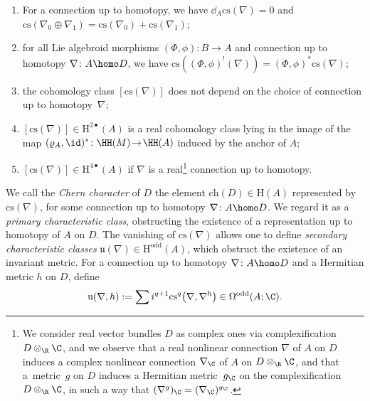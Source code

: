 \begin{proposition}\label{pro : primary}\quad
 \begin{enumerate}\itemsep=0pt
 \item[$a)$] For a connection up to homotopy, we have $\dd_A\mathrm{cs}(\nabla) = 0$ and $\mathrm{cs}(\nabla_0 \oplus \nabla_1)=\mathrm{cs}(\nabla_0)+\mathrm{cs}(\nabla_1)$;
 \item[$b)$] for all Lie algebroid morphisms $(\Phi,\phi)\colon B \to A$ and connection up to homotopy $\nabla\colon A \homo D$, we have $\mathrm{cs}((\Phi,\phi)^!(\nabla)) = (\Phi,\phi)^*\mathrm{cs}(\nabla)$;
 \item[$c)$] the cohomology class $[\mathrm{cs}(\nabla)]$ does not depend on the choice of connection up to homotopy~$\nabla$;
 \item[$d)$] $[\mathrm{cs}(\nabla)] \!\in\! \mathrm{H}^{2\bullet}(A)$ is a real cohomology class lying in the image of the map $(\varrho_A,\id)^*\colon \HH(M) \!\to\! \HH(A)$ induced by the anchor of $A$;
 \item[$e)$] $[\mathrm{cs}(\nabla)] \in \mathrm{H}^{4\bullet}(A)$ if $\nabla$ is a real\footnote{We consider real vector bundles $D$ as complex ones via complexification $D \otimes_{\R}\C$, and we observe that a real nonlinear connection $\nabla$ of $A$ on $D$ induces a complex nonlinear connection $\nabla_{\C}$ of $A$ on $D \otimes_{\R}\C$, and that a~metric~$g$ on $D$ induces a Hermitian metric~$g_{\C}$ on the complexification $D \otimes_{\R}\C$, in such a way that $(\nabla^g)_{\C} = (\nabla_{\C})^{g_{\C}}$.} connection up to homotopy.
 \end{enumerate}
\end{proposition}

We call the {\it Chern character} of $D$ the element $\mathrm{ch}(D) \in \mathrm{H}(A)$ represented by $\mathrm{cs}(\nabla)$, for some connection up to homotopy $\nabla\colon A \homo D$. We regard it as a {\it primary characteristic class}, obstructing the existence of a representation up to homotopy of $A$ on $D$. The vanishing of $\mathrm{cs}(\nabla)$ allows one to define {\it secondary characteristic classes} $\mathfrak{u}(\nabla) \in \mathrm{H}^{\mathrm{odd}}(A)$, which obstruct the existence of an invariant metric. For a connection up to homotopy $\nabla\colon A \homo D$ and a Hermitian metric $h$ on $D$, define
\begin{gather*}
 \mathrm{u}(\nabla,h):= \sum i^{q+1}\mathrm{cs}^q\big(\nabla,\nabla^h\big) \in \Omega^{\mathrm{odd}}(A;\C).
\end{gather*}

